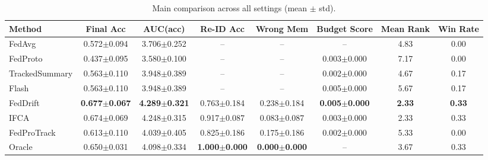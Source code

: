\begin{table}[t]
\centering
\caption{Main comparison across all settings (mean $\pm$ std).}
\label{tab:main}
\begin{tabular}{lccccccc}
\toprule
Method & Final Acc & AUC(acc) & Re-ID Acc & Wrong Mem & Budget Score & Mean Rank & Win Rate \\
\midrule
FedAvg & 0.572$\pm$0.094 & 3.706$\pm$0.252 & -- & -- & -- & 4.83 & 0.00 \\
FedProto & 0.437$\pm$0.095 & 3.580$\pm$0.100 & -- & -- & 0.003$\pm$0.000 & 7.17 & 0.00 \\
TrackedSummary & 0.563$\pm$0.110 & 3.948$\pm$0.389 & -- & -- & 0.002$\pm$0.000 & 4.67 & 0.17 \\
Flash & 0.563$\pm$0.110 & 3.948$\pm$0.389 & -- & -- & 0.005$\pm$0.000 & 5.67 & 0.17 \\
FedDrift & \textbf{0.677$\pm$0.067} & \textbf{4.289$\pm$0.321} & 0.763$\pm$0.184 & 0.238$\pm$0.184 & \textbf{0.005$\pm$0.000} & \textbf{2.33} & \textbf{0.33} \\
IFCA & 0.674$\pm$0.069 & 4.248$\pm$0.315 & 0.917$\pm$0.087 & 0.083$\pm$0.087 & 0.003$\pm$0.000 & 2.33 & 0.33 \\
FedProTrack & 0.613$\pm$0.110 & 4.039$\pm$0.405 & 0.825$\pm$0.186 & 0.175$\pm$0.186 & 0.002$\pm$0.000 & 5.33 & 0.00 \\
Oracle & 0.650$\pm$0.031 & 4.098$\pm$0.334 & \textbf{1.000$\pm$0.000} & \textbf{0.000$\pm$0.000} & -- & 3.67 & 0.33 \\
\bottomrule
\end{tabular}
\end{table}